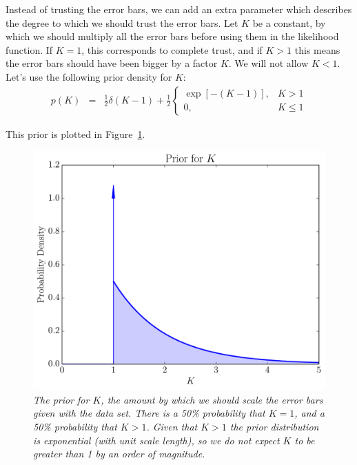 Instead of trusting the error bars, we can add an extra parameter which
describes the degree to which we should trust the error bars. Let $K$ be a
constant, by which we should multiply all the error bars before using them
in the likelihood function. If $K=1$, this corresponds to complete trust,
and if $K>1$ this means the error bars should have been bigger by a factor $K$.
We will not allow $K < 1$. Let's use the following prior density for $K$:
\begin{eqnarray}
p(K) &=& \frac{1}{2}\delta(K - 1)
+ \frac{1}{2}\left\{
\begin{array}{lr}
\exp\left[-(K-1)\right], & K > 1\\
0, & K \leq 1
\end{array}
\right.
\end{eqnarray}

This prior is plotted in Figure~\ref{fig:delta_mixture}.

\begin{figure}
\begin{center}
\includegraphics[scale=0.45]{delta_mixture.pdf}
\caption{\it The prior for $K$, the amount by which we should scale the error
bars given with the data set. There is a 50\% probability that $K=1$, and
a 50\% probability that $K > 1$. Given that $K > 1$ the prior distribution
is exponential (with unit scale length), so we do not expect $K$ to be
greater than 1 by an order of magnitude.\label{fig:delta_mixture}}
\end{center}
\end{figure}

